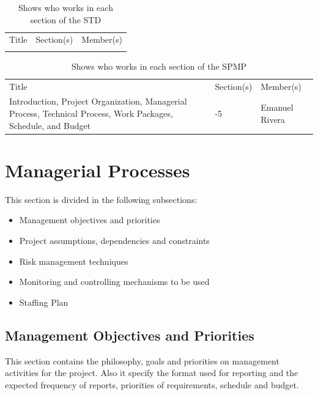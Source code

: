 \documentclass[12pt]{article}
\begin{document}
\begin{table}[H]\centering
\begin{tabular}{|>{\centering\arraybackslash}m{5cm}|>{\centering\arraybackslash}m{5cm}|>{\centering\arraybackslash}m{5cm}|}
  \hline
  \multicolumn{3}{|c|}{STD} \\
  \hline
  Title & Section(s) & Member(s) \\
   \hline
    &  &  \\
   \hline
\end{tabular}
\caption{Shows who works in each section of the STD}
\label{RespSTD}
\end{table}

\begin{table}[H]\centering
\begin{tabular}{|>{\centering\arraybackslash}m{5cm}|>{\centering\arraybackslash}m{5cm}|>{\centering\arraybackslash}m{5cm}|}
  \hline
  \multicolumn{3}{|c|}{SPMP} \\
  \hline
  Title & Section(s) & Member(s) \\
   \hline
   Introduction, Project Organization, Managerial Process, Technical Process, Work Packages, Schedule, and Budget & 1-5  & Emanuel Rivera \\
   \hline
\end{tabular}
\caption{Shows who works in each section of the SPMP}
\label{RespSPMP}
\end{table}

\section{Managerial Processes}
This section is divided in the following subsections:
\begin{itemize}
  \item Management objectives and priorities
  \item Project assumptions, dependencies and constraints
  \item Risk management techniques 
  \item Monitoring and controlling mechanisms to be used
  \item Staffing Plan
\end{itemize}

\subsection{Management Objectives and Priorities}
This section contains the philosophy, goals and priorities on management activities for the project. Also it specify the format used for reporting and the expected frequency of reports, priorities of requirements, schedule and budget.
\end{document}
